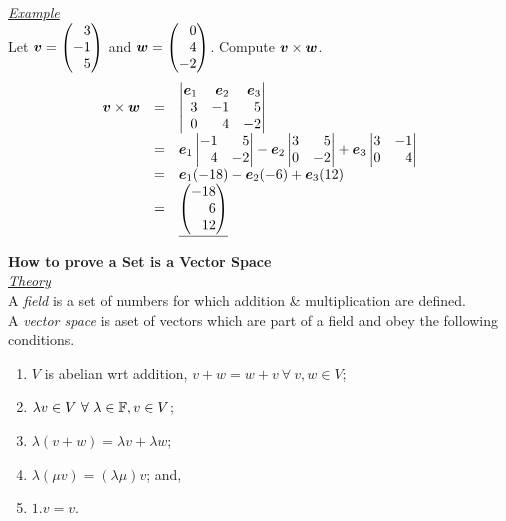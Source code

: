 \documentclass[11pt,a4paper]{article}
\begin{document}
\newpage\underline{\textit{Example}}\\
Let $\vect{v} = \begin{pmatrix*}[r] 3 \\ -1 \\ 5 \end{pmatrix*}$ and $\vect{w} = \begin{pmatrix*}[r] 0 \\ 4 \\ -2 \end{pmatrix*}$. Compute $\boldsymbol{v} \times \boldsymbol{w}$.
\[\begin{array}{rcl}
  \vect{v} \times \vect{w} &=& \begin{vmatrix*}[r] \vect{e}_1 & \vect{e}_2 & \vect{e}_3 \\ 3 & -1 & 5 \\ 0 & 4 & -2\end{vmatrix*}\\
  &=& \vect{e}_1 \begin{vmatrix*}[r] -1 & 5 \\ 4 & -2 \end{vmatrix*} - \vect{e}_2 \begin{vmatrix*}[r] 3 & 5 \\ 0 & -2 \end{vmatrix*} + \vect{e}_3 \begin{vmatrix*}[r] 3 & -1 \\ 0 & 4 \end{vmatrix*}\\
  &=& \vect{e}_1(-18) - \vect{e}_2(-6) + \vect{e}_3(12)\\
  &=& \underline{\begin{pmatrix*}[r] -18 \\ 6 \\ 12 \end{pmatrix*}}
\end{array}\]

\textbf{How to prove a Set is a Vector Space}\\

\underline{\textit{Theory}}\\
A \textit{field} is a set of numbers for which addition \& multiplication are defined.\\
A \textit{vector space} is aset of vectors which are part of a field and obey the following conditions.
\begin{enumerate}[label=\roman*)]
  \itemsep0em
  \item $V$ is abelian wrt addition, $v + w = w + v\ \forall\ v, w \in V$;
  \item $\lambda v \in V\ \forall\ \lambda \in \mathbb{F}, v \in V$;
  \item $\lambda(v + w) = \lambda v + \lambda w$;
  \item $\lambda(\mu v) = (\lambda\mu)v$; and,
  \item $1.v = v$.
\end{enumerate}
\end{document}
